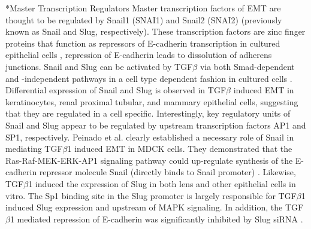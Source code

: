 \documentclass[12pt]{article}
\makeatletter
\renewcommand\subsubsection{\@startsection
	{subsubsection}{2}{0mm}
	{-0.05in}
	{-0.5\baselineskip}
	{\normalfont\normalsize\itshape}}
\makeatother
\begin{document}
\subsubsection*{Master Transcription Regulators}
Master transcription factors of EMT are thought to be regulated by Snail1 (SNAI1) and Snail2 (SNAI2) (previously known as Snail and Slug, respectively).
These transcription factors are zinc finger proteins that function as repressors of E-cadherin transcription in cultured epithelial cells \cite{Cano:2000kh}, repression of E-cadherin leads to dissolution of adherens junctions.
Snail and Slug can be activated by TGF$\beta$ via both Smad-dependent and -independent pathways in a cell type dependent fashion in cultured cells \cite{Peinado2003}.
Differential expression of Snail and Slug is observed in TGF$\beta$ induced EMT in keratinocytes, renal proximal tubular, and mammary epithelial cells, suggesting that they are regulated in a cell specific.
Interestingly, key regulatory units of Snail and Slug appear to be regulated by upstream transcription factors AP1 and SP1, respectively.
Peinado et al. clearly established a necessary role of Snail in mediating TGF$\beta$1 induced EMT in MDCK cells.
They demonstrated that the Ras-Raf-MEK-ERK-AP1 signaling pathway could up-regulate synthesis of the E-cadherin repressor molecule Snail (directly binds to Snail promoter) \cite{Peinado:2004pt}.
Likewise, TGF$\beta$1 induced the expression of Slug in both lens and other epithelial cells in vitro.
The Sp1 binding site in the Slug promoter is largely responsible for TGF$\beta$1 induced Slug expression and upstream of MAPK signaling.
In addition, the TGF$\beta$1 mediated repression of E-cadherin was significantly inhibited by Slug siRNA \cite{Choi2007}.
\end{document}
